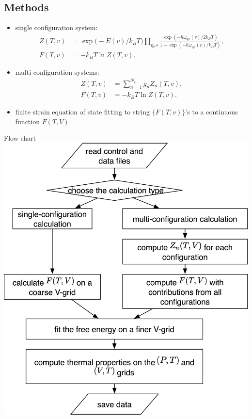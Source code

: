 \documentclass[13pt,aspectratio=169]{beamer}
\begin{document}
\subsection{Methods}
\begin{frame}{\subsecname}
	\begin{itemize}[<+(1)->]
		\item single configuration system:
		      \begin{align}
			      Z(T, v) & = \exp\big( -{E(v)}/{k_B T} \big) \prod_{\bm{q}, s} \frac{\exp(-\hbar \omega_{\bm{q}s}(v)/2k_B T)}{1 - \exp(-\hbar \omega_{\bm{q}s}(v)/k_B T)}, \\
			      F(T, v) & = -k_B T \ln Z(T, v).
		      \end{align}
		\item multi-configuration systems:
		      \begin{align}
			      Z(T, v) & = \sum_{n=1}^{N_c} g_n Z_n (T, v), \\
			      F(T, v) & = -k_B T \ln Z(T, v).
		      \end{align}
		\item finite strain equation of state fitting to string $\{F(T, v)\}$’s to a continuous function $F(T, V)$
	\end{itemize}
\end{frame}

\begin{frame}{Flow chart}
	\centering
	\includegraphics[height=0.95\textheight]{images/flow}%
\end{frame}
\end{document}
